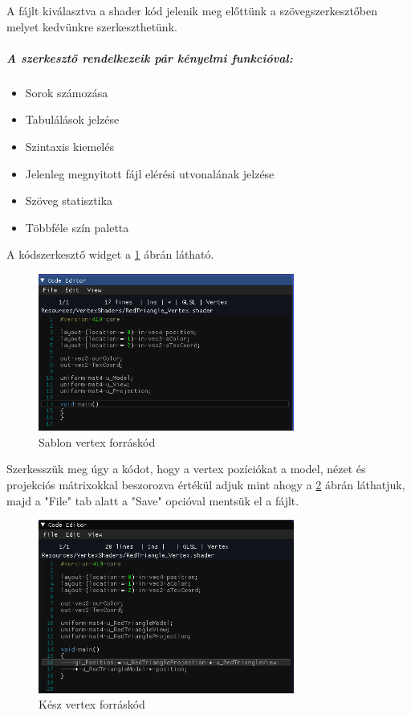 A fájlt kiválasztva a shader kód jelenik meg előttünk a szövegszerkesztőben melyet kedvünkre szerkeszthetünk. 

\subparagraph*{A szerkesztő rendelkezeik pár kényelmi funkcióval:}
\begin{itemize}
    \item Sorok számozása
    \item Tabulálások jelzése
    \item Szintaxis kiemelés
    \item Jelenleg megnyitott fájl elérési utvonalának jelzése
    \item Szöveg statisztika
    \item Többféle szín paletta
\end{itemize}

A kódszerkesztő widget a \ref{fig:vertexcode} ábrán látható.

\begin{figure}
    \centering
    \includegraphics[width=0.75\textwidth,height=\textheight/2,keepaspectratio]
    {resources/Showcase/slimshady_vertexcode.png}
    \caption{Sablon vertex forráskód}
    \label{fig:vertexcode}
\end{figure}

\newpage

Szerkesszük meg úgy a kódot, hogy a vertex pozíciókat a model, nézet és projekciós mátrixokkal beszorozva értékül adjuk mint ahogy a \ref{fig:vertexdone} ábrán láthatjuk, majd a "File" tab alatt a "Save" opcióval mentsük el a fájlt.

\begin{figure}[hbt!]
    \centering
    \includegraphics[width=0.75\textwidth,height=\textheight/2,keepaspectratio]
    {resources/Showcase/slimshady_vertexcodeDone.png}
    \caption{Kész vertex forráskód}
    \label{fig:vertexdone}
\end{figure}

